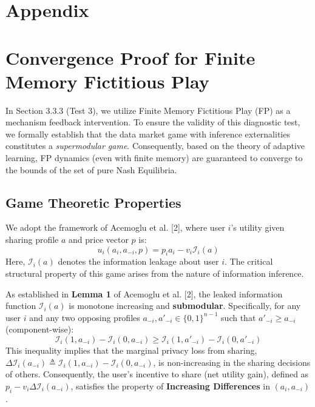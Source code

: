 ﻿\appendix
\section*{Appendix}
\section{Convergence Proof for Finite Memory Fictitious Play}
\label{app:fp_proof}

In Section 3.3.3 (Test 3), we utilize Finite Memory Fictitious Play (FP) as a mechanism feedback intervention. To ensure the validity of this diagnostic test, we formally establish that the data market game with inference externalities constitutes a \textit{supermodular game}. Consequently, based on the theory of adaptive learning, FP dynamics (even with finite memory) are guaranteed to converge to the bounds of the set of pure Nash Equilibria.

\subsection{Game Theoretic Properties}

We adopt the framework of Acemoglu et al. [2], where user $i$'s utility given sharing profile $a$ and price vector $p$ is:
\begin{equation}
    u_i(a_i, a_{-i}, p) = p_i a_i - v_i \mathcal{I}_i(a)
\end{equation}
Here, $\mathcal{I}_i(a)$ denotes the information leakage about user $i$. The critical structural property of this game arises from the nature of information inference.

\begin{lemma}
\label{lemma:submodularity}
As established in \textbf{Lemma 1} of Acemoglu et al. [2], the leaked information function $\mathcal{I}_i(a)$ is monotone increasing and \textbf{submodular}. Specifically, for any user $i$ and any two opposing profiles $a_{-i}, a'_{-i} \in \{0,1\}^{n-1}$ such that $a'_{-i} \geq a_{-i}$ (component-wise):
\begin{equation}
    \mathcal{I}_i(1, a_{-i}) - \mathcal{I}_i(0, a_{-i}) \geq \mathcal{I}_i(1, a'_{-i}) - \mathcal{I}_i(0, a'_{-i})
\end{equation}
This inequality implies that the marginal privacy loss from sharing, $\Delta \mathcal{I}_i(a_{-i}) \triangleq \mathcal{I}_i(1, a_{-i}) - \mathcal{I}_i(0, a_{-i})$, is non-increasing in the sharing decisions of others. Consequently, the user's incentive to share (net utility gain), defined as $p_i - v_i \Delta \mathcal{I}_i(a_{-i})$, satisfies the property of \textbf{Increasing Differences} in $(a_i, a_{-i})$.
\end{lemma}

